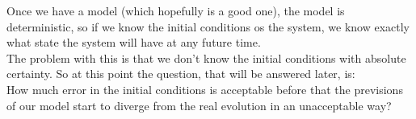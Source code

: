 Once we have a model (which hopefully is a good one), the model is deterministic, so if we know the initial conditions os the system, we know exactly what state the system will have at any future time. \\
The problem with this is that we don't know the initial conditions with absolute certainty. So at this point the question, that will be answered later, is: \\
How much error in the initial conditions is acceptable before that the previsions of our model start to diverge from the real evolution in an unacceptable way?